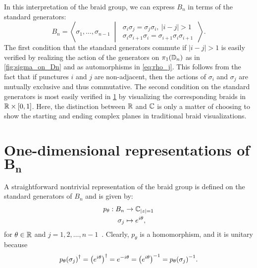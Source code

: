 In this interpretation of the braid group, we can express $B_n$ in terms of the standard generators:
\begin{equation}\label{eq:BnGenYangBaxter}
    B_n = \left\langle \sigma_1,\dots,\sigma_{n-1} \;\middle|\;
    \begin{aligned}
        \sigma_i\sigma_j = \sigma_j\sigma_i,\ |i-j|>1 \\
        \sigma_i\sigma_{i+1}\sigma_i = \sigma_{i+1}\sigma_i\sigma_{i+1}\ 
    \end{aligned}
    \right\rangle.
\end{equation}
The first condition that the standard generators commute if $|i-j|>1$ is easily verified by realizing the action of the generators on $\pi_1(\mathbb{D}_n)$ as in \cref{fig:sigma_on_Dn} and as automorphisms in \cref{eq:rho_j}. This follows from the fact that if punctures $i$ and $j$ are non-adjacent, then the actions of $\sigma_i$ and $\sigma_j$ are mutually exclusive and thus commutative. The second condition on the standard generators is most easily verified in \cref{fig:YB_criterion_verification} by visualizing the corresponding braids in $\mathbb{R}\times[0,1]$. Here, the distinction between $\mathbb{R}$ and $\mathbb{C}$ is only a matter of choosing to show the starting and ending complex planes in traditional braid visualizations.
\begin{figure}[htbp]
    \centering
    
    \label{fig:YB_criterion_verification}
\end{figure}

\section[One-dimensional representations of $B_n$]{One-dimensional representations of $\mathbf{B_n}$}\label{sec:1D_rep}
A straightforward nontrivial representation of the braid group is defined on the standard generators of $B_n$ and is given by:
\begin{align}
    \begin{split}        
    p_\theta: B_n&\to \mathbb{C}_{\left|z\right|=1} \\
    \sigma_j &\mapsto e^{i\theta},
    \end{split}
\end{align}
for $\theta\in\mathbb{R}$ and $j=1,2,\dots,n-1$~\cite{Deshmukh}. Clearly, $p_\theta$ is a homomorphism, and it is unitary because
\begin{equation}
    {p_\theta(\sigma_j)}^\dagger = {\left( e^{i\theta} \right)}^\dagger = e^{-i\theta} = { \left( e^{i\theta} \right) }^{-1} = { p_\theta(\sigma_j) }^{-1}.
\end{equation}

